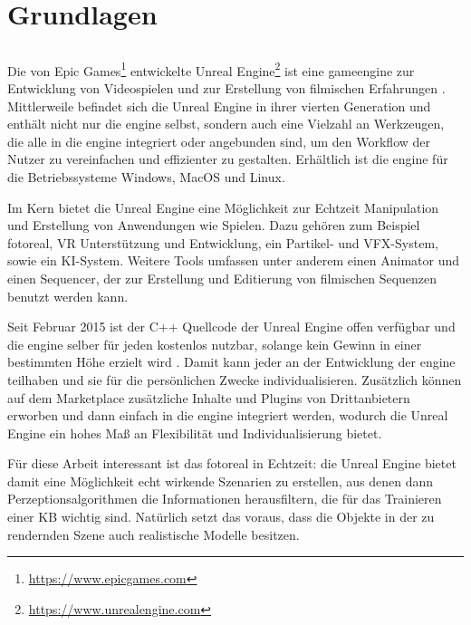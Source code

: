 \graphicspath{{./images/}}      
\def\CHAPTERONE{./chapters/Chapter-1} 

\chapter{Grundlagen}
\label{chap:software}
%	

\section{\unreal}
\label{sec:unrealengine}
Die von Epic Games\footnote{\url{https://www.epicgames.com}} entwickelte Unreal Engine\footnote{\url{https://www.unrealengine.com}} ist eine \gls{gameengine} zur Entwicklung von Videospielen und zur Erstellung von filmischen Erfahrungen \cite{featUnreal}. Mittlerweile befindet sich die Unreal Engine in ihrer vierten Generation und enthält nicht nur die \acrshort{engine} selbst, sondern auch eine Vielzahl an Werkzeugen, die alle in die \acrshort{engine} integriert oder angebunden sind, um den Workflow der Nutzer zu vereinfachen und effizienter zu gestalten. Erhältlich ist die \acrshort{engine} für die Betriebssysteme Windows, MacOS und Linux. \par

Im Kern bietet die Unreal Engine eine Möglichkeit zur Echtzeit Manipulation und Erstellung von Anwendungen wie Spielen. Dazu gehören zum Beispiel \gls{fotoreal}, VR Unterstützung und Entwicklung, ein Partikel- und VFX-System, sowie ein KI-System. Weitere Tools umfassen unter anderem einen Animator und einen Sequencer, der zur Erstellung und Editierung von filmischen Sequenzen benutzt werden kann. \par 

Seit Februar 2015 ist der C++ Quellcode der Unreal Engine offen verfügbar und die \acrshort{engine} selber für jeden kostenlos nutzbar, solange kein Gewinn in einer bestimmten Höhe erzielt wird \cite{freeUnreal}. Damit kann jeder an der Entwicklung der \acrshort{engine} teilhaben und sie für die persönlichen Zwecke individualisieren. Zusätzlich können auf dem Marketplace zusätzliche Inhalte und Plugins von Drittanbietern erworben und dann einfach in die \acrshort{engine} integriert werden, wodurch die Unreal Engine ein hohes Maß an Flexibilität und Individualisierung bietet. \par 

Für diese Arbeit interessant ist das \gls{fotoreal} in Echtzeit: die Unreal Engine bietet damit eine Möglichkeit echt wirkende Szenarien zu erstellen, aus denen dann Perzeptionsalgorithmen die Informationen herausfiltern, die für das Trainieren einer KB wichtig sind. Natürlich setzt das voraus, dass die Objekte in der zu rendernden Szene auch realistische Modelle besitzen.     

